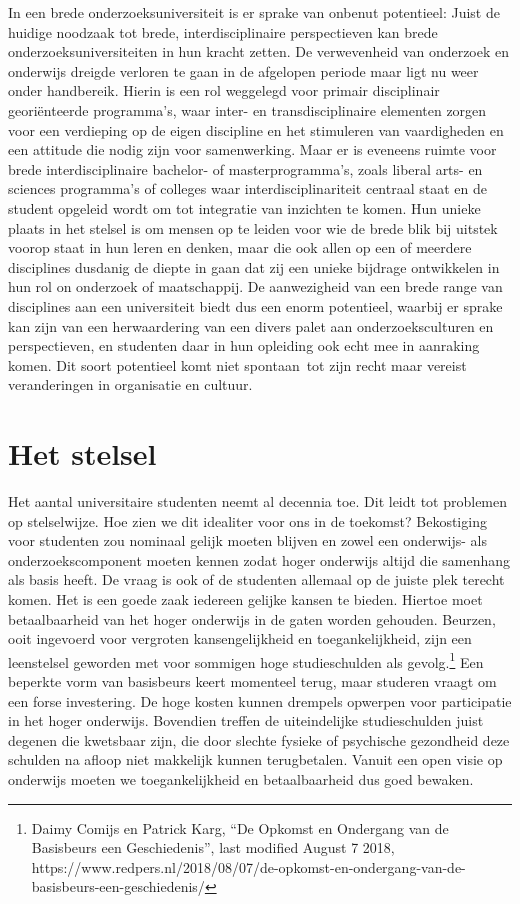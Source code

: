 \documentclass[empirical, authordate, ]{new-jote-article}
\begin{document}
	In een brede onderzoeksuniversiteit is er sprake van onbenut potentieel: Juist de huidige noodzaak tot brede, interdisciplinaire perspectieven kan brede onderzoeksuniversiteiten in hun kracht zetten. De verwevenheid van onderzoek en onderwijs dreigde verloren te gaan in de afgelopen periode maar ligt nu weer onder handbereik. Hierin is een rol weggelegd voor primair disciplinair georiënteerde programma's, waar inter- en transdisciplinaire elementen zorgen voor een verdieping op de eigen discipline en het stimuleren van vaardigheden en een attitude die nodig zijn voor samenwerking. Maar er is eveneens ruimte voor brede interdisciplinaire bachelor- of masterprogramma's, zoals liberal arts- en sciences programma's of colleges waar interdisciplinariteit centraal staat en de student opgeleid wordt om tot integratie van inzichten te komen. Hun unieke plaats in het stelsel is om mensen op te leiden voor wie de brede blik bij uitstek voorop staat in hun leren en denken, maar die ook allen op een of meerdere disciplines dusdanig de diepte in gaan dat zij een unieke bijdrage ontwikkelen in hun rol on onderzoek of maatschappij. De aanwezigheid van een brede range van disciplines aan een universiteit biedt dus een enorm potentieel, waarbij er sprake kan zijn van een herwaardering van een divers palet aan onderzoeksculturen en perspectieven, en studenten daar in hun opleiding ook echt mee in aanraking komen. Dit soort potentieel komt niet spontaan tot zijn recht maar vereist veranderingen in organisatie en cultuur.



	\section{Het stelsel}



	Het aantal universitaire studenten neemt al decennia toe. Dit leidt tot problemen op stelselwijze. Hoe zien we dit idealiter voor ons in de toekomst? Bekostiging voor studenten zou nominaal gelijk moeten blijven en zowel een onderwijs- als onderzoekscomponent moeten kennen zodat hoger onderwijs altijd die samenhang als basis heeft. De vraag is ook of de studenten allemaal op de juiste plek terecht komen. Het is een goede zaak iedereen gelijke kansen te bieden. Hiertoe moet betaalbaarheid van het hoger onderwijs in de gaten worden gehouden. Beurzen, ooit ingevoerd voor vergroten kansengelijkheid en toegankelijkheid, zijn een leenstelsel geworden met voor sommigen hoge studieschulden als gevolg.\footnote{Daimy Comijs en Patrick Karg, “De Opkomst en Ondergang van de Basisbeurs een Geschiedenis”, last modified August 7 2018, https://www.redpers.nl/2018/08/07/de-opkomst-en-ondergang-van-de-basisbeurs-een-geschiedenis/} Een beperkte vorm van basisbeurs keert momenteel terug, maar studeren vraagt om een forse investering. De hoge kosten kunnen drempels opwerpen voor participatie in het hoger onderwijs. Bovendien treffen de uiteindelijke studieschulden juist degenen die kwetsbaar zijn, die door slechte fysieke of psychische gezondheid deze schulden na afloop niet makkelijk kunnen terugbetalen. Vanuit een open visie op onderwijs moeten we toegankelijkheid en betaalbaarheid dus goed bewaken.
\end{document}
